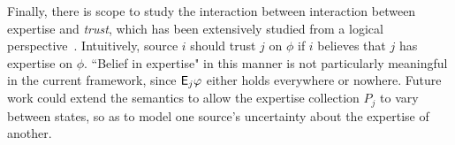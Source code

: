 Finally, there is scope to study the interaction between interaction between
expertise and \emph{trust}, which has been extensively studied from a logical
perspective~\cite{booth_trust_2018,Liau_2003,lorini2014trust,herzig2010logic}.
Intuitively, source $i$ should trust $j$ on $\phi$ if $i$ believes that $j$ has
expertise on $\phi$. ``Belief in expertise" in this manner is not particularly
meaningful in the current framework, since $\mathsf{E}_j\varphi$ either holds everywhere
or nowhere. Future work could extend the semantics to allow the expertise
collection $P_j$ to vary between states, so as to model one source's
uncertainty about the expertise of another.
